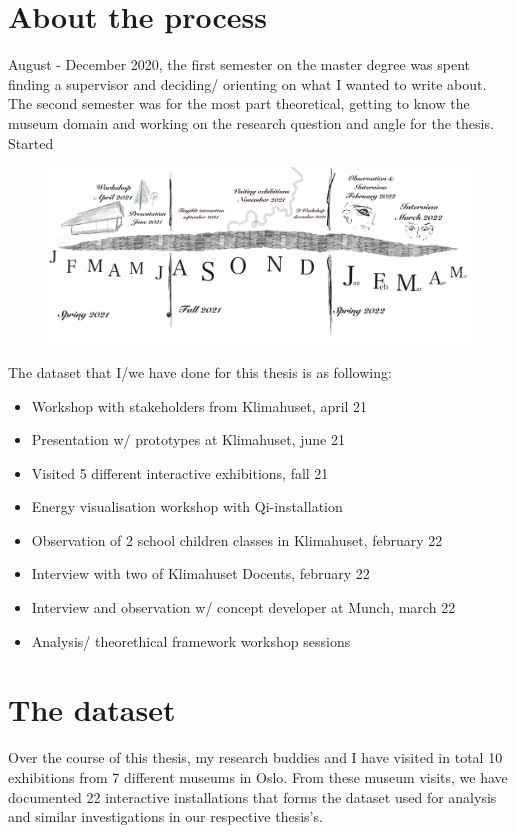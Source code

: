 \section{About the process }

August - December 2020, the first semester on the master degree was spent finding a supervisor and deciding/ orienting on what I wanted to write about. The second semester was for the most part theoretical, getting to know the museum domain and working on the research question and angle for the thesis. Started 

\begin{figure}[h]
\includegraphics[width=13cm]{pictures/timeline.jpg}
\centering 
\end{figure}


The dataset that I/we have done for this thesis is as following:
\begin{itemize}
    \item Workshop with stakeholders from Klimahuset, april 21
    \item Presentation w/ prototypes at Klimahuset, june 21
    \item Visited 5 different interactive exhibitions, fall 21
    \item Energy visualisation workshop with Qi-installation
    \item Observation of 2 school children classes in Klimahuset, february 22
    \item Interview with two of Klimahuset Docents, february 22
    \item Interview and observation w/ concept developer at Munch, march 22
    \item Analysis/ theorethical framework workshop sessions
\end{itemize}

\section{The dataset}
Over the course of this thesis, my research buddies and I have visited in total 10 exhibitions from 7 different museums in Oslo. From these museum visits, we have documented 22 interactive installations that forms the dataset used for analysis and similar investigations in our respective thesis's. 

